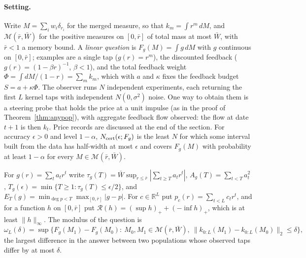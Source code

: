 \documentclass[12pt]{article}
\theoremstyle{definition}
\theoremstyle{remark}
\begin{document}
\paragraph{Setting.} Write $M=\sum_iw_i\delta_{r_i}$ for the merged measure, so that $k_m=\int r^m\,dM$, and $\mathcal M(\bar r,\bar W)$ for the positive measures on $[0,\bar r]$ of total mass at most $\bar W$, with $\bar r<1$ a memory bound. A \emph{linear question} is $F_g(M)=\int g\,dM$ with $g$ continuous on $[0,\bar r]$; examples are a single tap ($g(r)=r^m$), the discounted feedback ($g(r)=(1-\beta r)^{-1}$, $\beta<1$), and the total feedback weight $\Phi=\int dM/(1-r)=\sum_m k_m$, which with $a$ and $\kappa$ fixes the feedback budget $S=a+\kappa\Phi$. The observer runs $N$ independent experiments, each returning the first $L$ kernel taps with independent $N(0,\sigma^2)$ noise. One way to obtain them is a steering probe that holds the price at a unit impulse (as in the proof of Theorem~\ref{thm:anypop}), with aggregate feedback flow observed: the flow at date $t+1$ is then $k_t$. Price records are discussed at the end of the section. For accuracy $\epsilon>0$ and level $1-\alpha$, $N_{\rm cert}(\epsilon;F_g)$ is the least $N$ for which some interval built from the data has half-width at most $\epsilon$ and covers $F_g(M)$ with probability at least $1-\alpha$ for every $M\in\mathcal M(\bar r,\bar W)$.

For $g(r)=\sum_ta_tr^t$ write $\tau_g(T)=\bar W\sup_{r\le\bar r}|\sum_{t\ge T}a_tr^t|$, $A_g(T)=\sum_{t<T}a_t^2$, $T_g(\epsilon)=\min\{T\ge1:\tau_g(T)\le\epsilon/2\}$, and $E_T(g)=\min_{\deg p<T}\max_{[0,\bar r]}|g-p|$. For $c\in\mathbb R^L$ put $p_c(r)=\sum_{t<L}c_tr^t$, and for a function $h$ on $[0,\bar r]$ put $\mathcal R(h)=(\sup h)_++(-\inf h)_+$, which is at least $\|h\|_\infty$. The modulus of the question is
\[
 \omega_L(\delta)=\sup\bigl\{F_g(M_1)-F_g(M_0):\ M_0,M_1\in\mathcal M(\bar r,\bar W),\ \|k_{0:L}(M_1)-k_{0:L}(M_0)\|_2\le\delta\bigr\},
\]
the largest difference in the answer between two populations whose observed taps differ by at most $\delta$.
\end{document}
